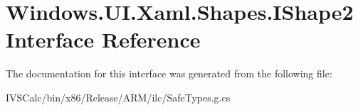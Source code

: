 \hypertarget{interface_windows_1_1_u_i_1_1_xaml_1_1_shapes_1_1_i_shape2}{}\section{Windows.\+U\+I.\+Xaml.\+Shapes.\+I\+Shape2 Interface Reference}
\label{interface_windows_1_1_u_i_1_1_xaml_1_1_shapes_1_1_i_shape2}


The documentation for this interface was generated from the following file\+:\begin{DoxyCompactItemize}
\item 
I\+V\+S\+Calc/bin/x86/\+Release/\+A\+R\+M/ilc/Safe\+Types.\+g.\+cs\end{DoxyCompactItemize}

